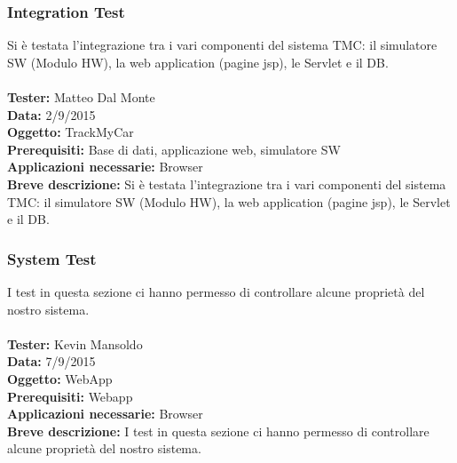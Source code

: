 \documentclass[a4paper,12pt]{article}
\begin{document}
\pagebreak

\subsubsection{Integration Test}

Si è testata l'integrazione tra i vari componenti del sistema TMC: il simulatore SW (Modulo HW), la web application (pagine jsp), le Servlet e il DB.\\\\
\textbf{Tester:} Matteo Dal Monte\\
\textbf{Data:} 2/9/2015\\
\textbf{Oggetto:} TrackMyCar\\
\textbf{Prerequisiti:} Base di dati, applicazione web, simulatore SW\\
\textbf{Applicazioni necessarie:} Browser\\
\textbf{Breve descrizione:} Si è testata l'integrazione tra i vari componenti del sistema TMC: il simulatore SW (Modulo HW), la web application (pagine jsp), le Servlet e il DB.\\

\pagebreak

\subsubsection{System Test}

I test in questa sezione ci hanno permesso di controllare alcune proprietà del nostro sistema.\\ \\
\textbf{Tester:} Kevin Mansoldo\\
\textbf{Data:} 7/9/2015\\
\textbf{Oggetto:} WebApp\\
\textbf{Prerequisiti:} Webapp\\
\textbf{Applicazioni necessarie:} Browser\\
\textbf{Breve descrizione:} I test in questa sezione ci hanno permesso di controllare alcune proprietà  del nostro sistema.\\
\end{document}
